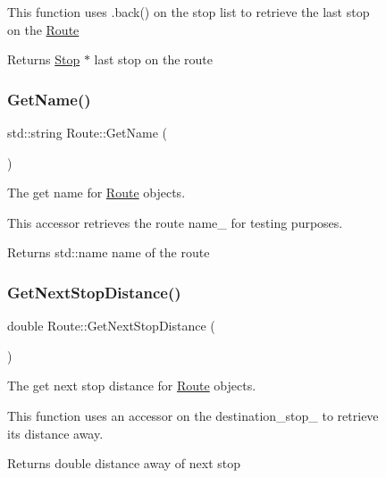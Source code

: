 \begin{figure}[H]
\begin{center}
This function uses .back() on the stop list to retrieve the last stop on the \hyperlink{classRoute}{Route}

\begin{DoxyReturn}{Returns}
\hyperlink{classStop}{Stop} $\ast$ last stop on the route 
\end{DoxyReturn}
\mbox{\label{classRoute_a8d05485fe63fbd66fd093d423667ca61}} 
\subsubsection{\texorpdfstring{Get\+Name()}{GetName()}}
{\footnotesize\ttfamily std\+::string Route\+::\+Get\+Name (\begin{DoxyParamCaption}{ }\end{DoxyParamCaption})}



The get name for \hyperlink{classRoute}{Route} objects. 

This accessor retrieves the route name\+\_\+ for testing purposes.

\begin{DoxyReturn}{Returns}
std\+::name name of the route 
\end{DoxyReturn}
\mbox{\label{classRoute_a81b012b2f33a4ead1b084bd3bc308905}} 
\subsubsection{\texorpdfstring{Get\+Next\+Stop\+Distance()}{GetNextStopDistance()}}
{\footnotesize\ttfamily double Route\+::\+Get\+Next\+Stop\+Distance (\begin{DoxyParamCaption}{ }\end{DoxyParamCaption})}



The get next stop distance for \hyperlink{classRoute}{Route} objects. 

This function uses an accessor on the destination\+\_\+stop\+\_\+ to retrieve its distance away.

\begin{DoxyReturn}{Returns}
double distance away of next stop 
\end{DoxyReturn}
\mbox{\label{classRoute_a2699ed2b1899d8b053cb9363e6dc35b1}} 

\end{center}
\end{figure}
